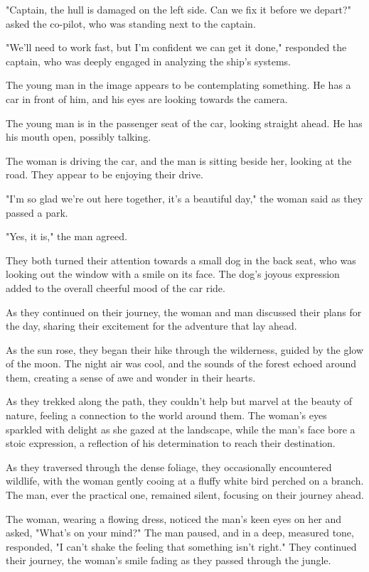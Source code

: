 \documentclass[smalldemyvopaper,11pt,twoside,onecolumn,openright,extrafontsizes]{memoir}
\begin{document}
"Captain, the hull is damaged on the left side. Can we fix it before we depart?" asked the co-pilot, who was standing next to the captain.\par
"We'll need to work fast, but I'm confident we can get it done," responded the captain, who was deeply engaged in analyzing the ship's systems.\par
The young man in the image appears to be contemplating something. He has a car in front of him, and his eyes are looking towards the camera.\par
The young man is in the passenger seat of the car, looking straight ahead. He has his mouth open, possibly talking.\par
The woman is driving the car, and the man is sitting beside her, looking at the road. They appear to be enjoying their drive.\par
"I'm so glad we're out here together, it's a beautiful day," the woman said as they passed a park.\par
"Yes, it is," the man agreed.\par
They both turned their attention towards a small dog in the back seat, who was looking out the window with a smile on its face. The dog's joyous expression added to the overall cheerful mood of the car ride.\par
As they continued on their journey, the woman and man discussed their plans for the day, sharing their excitement for the adventure that lay ahead.\par
As the sun rose, they began their hike through the wilderness, guided by the glow of the moon. The night air was cool, and the sounds of the forest echoed around them, creating a sense of awe and wonder in their hearts.\par
As they trekked along the path, they couldn't help but marvel at the beauty of nature, feeling a connection to the world around them. The woman's eyes sparkled with delight as she gazed at the landscape, while the man's face bore a stoic expression, a reflection of his determination to reach their destination.\par
As they traversed through the dense foliage, they occasionally encountered wildlife, with the woman gently cooing at a fluffy white bird perched on a branch. The man, ever the practical one, remained silent, focusing on their journey ahead.\par
The woman, wearing a flowing dress, noticed the man's keen eyes on her and asked, "What's on your mind?" The man paused, and in a deep, measured tone, responded, "I can't shake the feeling that something isn't right." They continued their journey, the woman's smile fading as they passed through the jungle.\par
\end{document}
